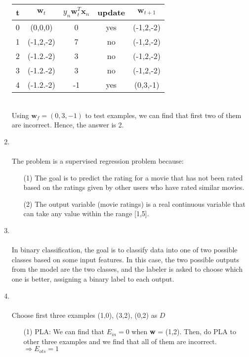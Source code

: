 \documentclass{article}
\begin{document}
\begin{enumerate}
    \begin{tabular}{|c c c c c|} 
        \hline
        t & $\textbf{w}_t$ & $y_n\textbf{w}_t^T\textbf{x}_n$ & update & $\textbf{w}_{t+1}$ \\ [0.5ex] 
        \hline
        0 & (0,0,0) & 0 & yes & (-1,2,-2) \\ 
        \hline
        1 & (-1,2,-2) & 7 & no & (-1,2,-2) \\
        \hline
        2 & (-1.2.-2) & 3 & no & (-1,2,-2) \\
        \hline
        3 & (-1.2.-2) & 3 & no & (-1,2,-2) \\
        \hline
        4 & (-1.2.-2) & -1 & yes & (0,3,-1) \\
        \hline
            \end{tabular}\\
    Using $\textbf{w}_f = (0,3,-1)$ to test examples, we can find that first two of them are incorrect.
    Hence, the answer is 2.\\
    \item \text{[a]}\\%
    \\The problem is a supervised regression problem because:
    \begin{enumerate}
        \item[(1)] The goal is to predict the rating for a movie that has not been rated based on the ratings given by other users who have rated similar movies.
        \item[(2)] The output variable (movie ratings) is a real continuous variable that can take any value within the range [1,5]. 
    \end{enumerate}
    \item \text{[b]}\\%
    \\In binary classification, the goal is to classify data into one of two possible classes based on some input features. In this case, the two possible outputs from the model are the two classes, and the labeler is asked to choose which one is better, assigning a binary label to each output.\\
    \item \text{[e]}\\%
    \\Choose first three examples (1,0), (3,2), (0,2) as $D$
    \begin{enumerate}
        \item[(1)] PLA: We can find that $E_{in} = 0$ when \textbf{w} = (1,2). Then, do PLA to other three examples and we find that all of them are incorrect. $\Rightarrow E_{ots} = 1$

\end{enumerate}
\end{enumerate}
\end{document}
